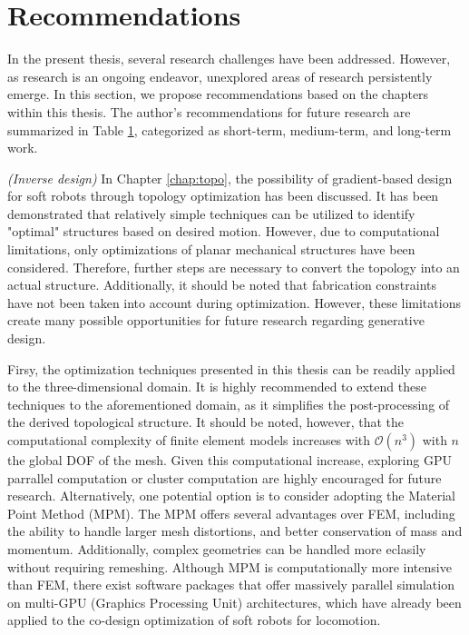 \section{Recommendations}
In the present thesis, several research challenges have been addressed. However, as research is an ongoing endeavor, unexplored areas of research persistently emerge. In this section, we propose recommendations based on the chapters within this thesis. The author's recommendations for future research are summarized in Table \ref{}, categorized as short-term, medium-term, and long-term work.

\textit{(Inverse design)} In Chapter \ref{chap:topo}, the possibility of gradient-based design for soft robots through topology optimization has been discussed. It has been demonstrated that relatively simple techniques can be utilized to identify "optimal" structures based on desired motion. However, due to computational limitations, only optimizations of planar mechanical structures have been considered. Therefore, further steps are necessary to convert the topology into an actual structure. Additionally, it should be noted that fabrication constraints have not been taken into account during optimization. However, these limitations create many possible opportunities for future research regarding generative design. 
\par Firsy, the optimization techniques presented in this thesis can be readily applied to the three-dimensional domain. It is highly recommended to extend these techniques to the aforementioned domain, as it simplifies the post-processing of the derived topological structure. It should be noted, however, that the computational complexity of finite element models increases with $\mathcal{O}(n^3)$ with $n$ the global DOF of the mesh. Given this computational increase, exploring GPU parrallel computation or cluster computation are highly encouraged for future research. Alternatively, one potential option is to consider adopting the Material Point Method (MPM). The MPM offers several advantages over FEM, including the ability to handle larger mesh distortions, and better conservation of mass and momentum. Additionally, complex geometries can be handled more eclasily without requiring remeshing. Although MPM is computationally more intensive than FEM, there exist software packages that offer massively parallel simulation on multi-GPU (Graphics Processing Unit) architectures, which have already been applied to the co-design optimization of soft robots for locomotion. 
